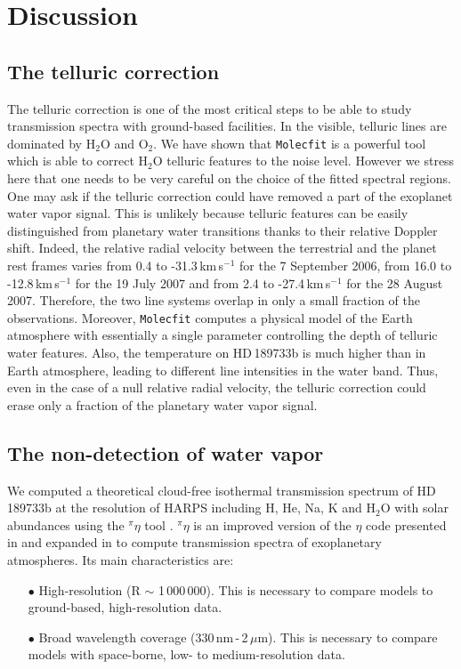 \documentclass{aa}
\begin{document}



\section{Discussion}
\label{discussion}
	\subsection{The telluric correction}
The telluric correction is one of the most critical steps to be able to study transmission spectra with ground-based facilities. In the visible, telluric lines are dominated by H$_{2}$O and O$_{2}$. We have shown that \texttt{Molecfit}  is a powerful tool which is able to correct H$_{2}$O telluric features to the noise level. However we stress here that one needs to be very careful on the choice of the fitted spectral regions.\\
One may ask if the telluric correction could have removed a part of the exoplanet water vapor signal. This is unlikely because telluric features can be easily distinguished from planetary water transitions thanks to their relative Doppler shift. Indeed, the relative radial velocity between the terrestrial and the planet rest frames varies from 0.4 to -31.3\,km\,s$^{-1}$ for the 7 September 2006, from 16.0 to -12.8\,km\,s$^{-1}$ for the 19 July 2007 and from 2.4 to -27.4\,km\,s$^{-1}$ for the 28 August 2007. Therefore, the two line systems overlap in only a small fraction of the observations. Moreover, \texttt{Molecfit} computes a physical model of the Earth atmosphere with essentially a single parameter controlling the depth of telluric water features. Also, the temperature on HD\,189733b is much higher than in Earth atmosphere, leading to different line intensities in the water band. Thus, even in the case of a null relative radial velocity, the telluric correction could erase only a fraction of the planetary water vapor signal. 
	\subsection{The non-detection of water vapor}
	\label{non-detection}
We computed a theoretical cloud-free isothermal transmission spectrum of HD\,189733b at the resolution of HARPS including H, He, Na, K and H$_{2}$O with solar abundances using the $^\pi \eta$ tool \citep{Pino_2017}. $^\pi \eta$ is an improved version of the $\eta$ code presented in \cite{ehrenreich_transmission_2006} and expanded in \cite{ehrenreich_transmission_2012} to compute transmission spectra of exoplanetary atmospheres. Its main characteristics are:
\begin{itemize}
\item[$\bullet$]   High-resolution (R $\sim$ 1\,000\,000). This is necessary to compare models to ground-based, high-resolution data.
\item[$\bullet$]  Broad wavelength coverage (330\,nm\,-\,2\,$\mu$m). This is necessary to compare models with space-borne, low- to medium-resolution data.
\end{itemize}
\end{document}
